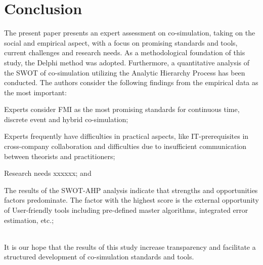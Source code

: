 \section{Conclusion}

The present paper presents an expert assessment on co-simulation, taking on the social and empirical aspect, with a focus on promising standards and tools, current challenges and research needs. 
As a methodological foundation of this study, the Delphi method was adopted.
Furthermore, a quantitative analysis of the SWOT of co-simulation utilizing the Analytic Hierarchy Process has been conducted.
The authors consider the following findings from the empirical data as the most important:

\begin{compactitem}
\item Experts consider FMI as the most promising standards for continuous time, discrete event  and  hybrid  co-simulation;
\item Experts frequently have difficulties in practical aspects, like IT-prerequisites in cross-company collaboration and difficulties due to
insufficient communication between theorists and practitioners;
\item Research needs xxxxxx; and 
\item The  results  of  the  SWOT-AHP  analysis  indicate that strengths and opportunities factors predominate.  The factor with the  highest  score  is  the  external  opportunity  of  User-friendly  tools  including pre-defined master algorithms, integrated error estimation, etc.;
\end{compactitem} \leavevmode
\\
It is our hope that the results of this study increase transparency and facilitate a structured development of co-simulation standards and tools.





